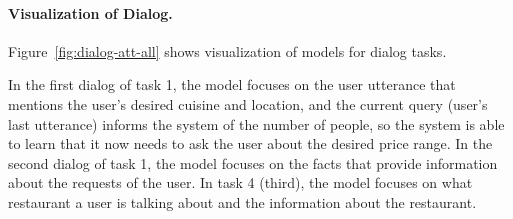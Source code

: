 \documentclass[table]{article}
\begin{document}
\paragraph{Visualization of Dialog.}
Figure~\ref{fig:dialog-att-all} shows visualization of models for dialog tasks.

In the first dialog of task 1, the model focuses on the user utterance that mentions the user's desired cuisine and location, and the current query (user's last utterance) informs the system of the number of people, so the system is able to learn that it now needs to ask the user about the desired price range. 
In the second dialog of task 1, the model focuses on the facts that provide information about the requests of the user.
In task 4 (third), the model focuses on what restaurant a user is talking about and the information about the restaurant.
\end{document}
